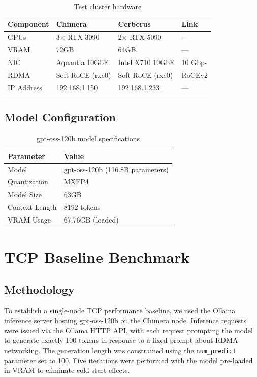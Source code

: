 \documentclass[10pt,letterpaper]{article}
\begin{document}
\begin{table}[H]
\centering
\small
\begin{tabular}{@{}llll@{}}
\toprule
\textbf{Component} & \textbf{Chimera} & \textbf{Cerberus} & \textbf{Link} \\
\midrule
GPUs & 3$\times$ RTX 3090 & 2$\times$ RTX 5090 & --- \\
VRAM & 72GB & 64GB & --- \\
NIC & Aquantia 10GbE & Intel X710 10GbE & 10 Gbps \\
RDMA & Soft-RoCE (rxe0) & Soft-RoCE (rxe0) & RoCEv2 \\
IP Address & 192.168.1.150 & 192.168.1.233 & --- \\
\bottomrule
\end{tabular}
\caption{Test cluster hardware}
\end{table}

\subsection{Model Configuration}

\begin{table}[H]
\centering
\small
\begin{tabular}{@{}ll@{}}
\toprule
\textbf{Parameter} & \textbf{Value} \\
\midrule
Model & gpt-oss-120b \cite{gptoss-hf} (116.8B parameters) \\
Quantization & MXFP4 \cite{mxfp4-paper} \\
Model Size & 63GB \\
Context Length & 8192 tokens \\
VRAM Usage & 67.76GB (loaded) \\
\bottomrule
\end{tabular}
\caption{gpt-oss-120b model specifications}
\end{table}

\section{TCP Baseline Benchmark}

\subsection{Methodology}

To establish a single-node TCP performance baseline, we used the Ollama inference server hosting gpt-oss-120b on the Chimera node. Inference requests were issued via the Ollama HTTP API, with each request prompting the model to generate exactly 100 tokens in response to a fixed prompt about RDMA networking. The generation length was constrained using the \texttt{num\_predict} parameter set to 100. Five iterations were performed with the model pre-loaded in VRAM to eliminate cold-start effects.
\end{document}

